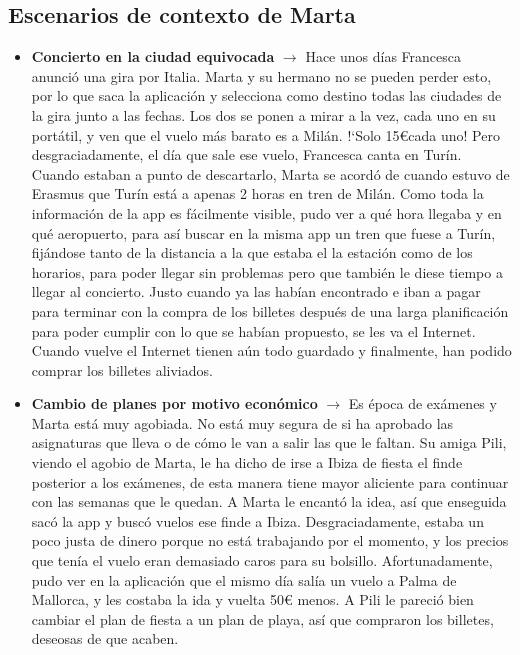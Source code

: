 \subsection{Escenarios de contexto de Marta}
\begin{itemize}
    \item \textbf{Concierto en la ciudad equivocada} $\rightarrow$ Hace unos días Francesca anunció una gira por Italia. Marta y su
    hermano no se pueden perder esto, por lo que saca la aplicación y selecciona como destino todas las ciudades de
    la gira junto a las fechas. Los dos se ponen a mirar a la vez, cada uno en su portátil, y ven que el vuelo más
    barato es a Milán. !`Solo 15\euro  cada uno! Pero desgraciadamente, el día que sale ese vuelo, Francesca canta en Turín.
    Cuando estaban a punto de descartarlo, Marta se acordó de cuando estuvo de Erasmus que Turín está a apenas 2 horas
    en tren de Milán. Como toda la información de la app es fácilmente visible, pudo ver a qué hora llegaba y en qué
    aeropuerto, para así buscar en la misma app un tren que fuese a Turín, fijándose tanto de la distancia a la que estaba el la estación como de los horarios, para poder llegar sin problemas pero que también le diese tiempo a llegar al concierto. Justo cuando ya las habían encontrado e iban a pagar para terminar con la compra de los billetes después de una larga planificación para poder cumplir con lo que se habían propuesto, se les va el Internet. Cuando vuelve el Internet tienen aún todo guardado y finalmente, han podido comprar los billetes aliviados.
    
    \item \textbf{Cambio de planes por motivo económico} $\rightarrow$ Es época de exámenes y Marta está muy agobiada.
    No está muy segura de si ha aprobado las asignaturas que lleva o de cómo le van a salir las que le faltan. Su amiga
    Pili, viendo el agobio de Marta, le ha dicho de irse a Ibiza de fiesta el finde posterior a los exámenes, de esta
    manera tiene mayor aliciente para continuar con las semanas que le quedan. A Marta le encantó la idea, así que
    enseguida sacó la app y buscó vuelos ese finde a Ibiza. Desgraciadamente, estaba un poco justa de dinero porque no
    está trabajando por el momento, y los precios que tenía el vuelo eran demasiado caros para su bolsillo. Afortunadamente,
    pudo ver en la aplicación que el mismo día salía un vuelo a Palma de Mallorca, y les costaba la ida y vuelta 50€
    menos. A Pili le pareció bien cambiar el plan de fiesta a un plan de playa, así que compraron los billetes, deseosas
    de que acaben.
\end{itemize}
